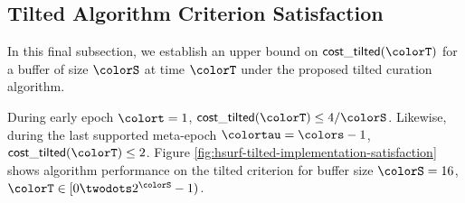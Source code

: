 \subsection{Tilted Algorithm Criterion Satisfaction}
\label{sec:tilted-satisfaction}



In this final subsection, we establish an upper bound on $\mathsf{cost\_tilted}(\colorT)$ for a buffer of size $\colorS$ at time $\colorT$ under the proposed tilted curation algorithm.



During early epoch $\colort = 1$, $\mathsf{cost\_tilted}(\colorT) \leq 4/\colorS$.
Likewise, during the last supported meta-epoch $\colortau = \colors - 1$, $\mathsf{cost\_tilted}(\colorT) \leq 2$.
Figure \ref{fig:hsurf-tilted-implementation-satisfaction} shows algorithm performance on the tilted criterion for buffer size $\colorS=16$, $\colorT \in [0\twodots 2^{\colorS} - 1)$.

